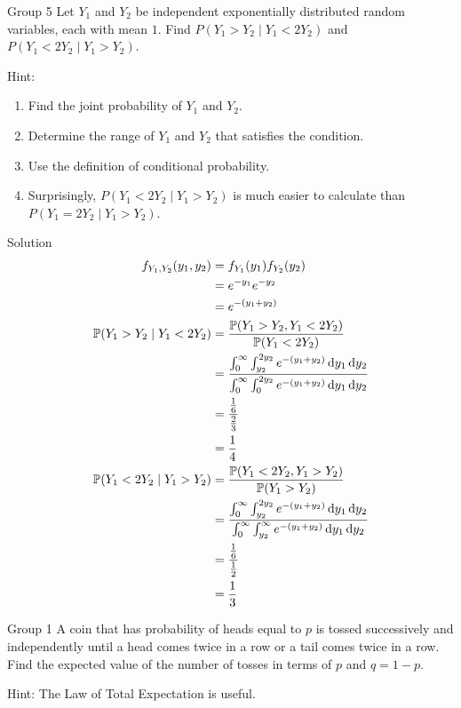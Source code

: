 \documentclass{article}
\begin{document}
\begin{problem}
    {Group 5}
    Let $Y_1$ and $Y_2$ be independent exponentially distributed random variables, each with mean $1$. Find $P( Y_1 > Y_2 \mid Y_1 < 2Y_2)$ and $P( Y_1 < 2Y_2 \mid Y_1 > Y_2)$.
    \begin{solution}
        {Hint:}
        \begin{enumerate}
            \item Find the joint probability of $Y_1$ and $Y_2$.
            \item Determine the range of $Y_1$ and $Y_2$ that satisfies the condition.
            \item Use the definition of conditional probability.
            \item Surprisingly, $P( Y_1 < 2Y_2 \mid Y_1 > Y_2)$ is much easier to calculate than $P( Y_1 = 2Y_2 \mid Y_1 > Y_2)$.
        \end{enumerate}
    \end{solution}
\end{problem}

\begin{solution}
    {Solution}
    \begin{align*}
        f_{Y_1,Y_2}(y_1,y_2)
        &= f_{Y_1}(y_1)f_{Y_2}(y_2) \\
        &= e^{-y_1}e^{-y_2} \\
        &= e^{-(y_1+y_2)} \\
        \P{Y_1>Y_2\mid Y_1<2Y_2}
        &= \frac{\P{Y_1>Y_2,Y_1<2Y_2}}{\P{Y_1<2Y_2}} \\
        &= \frac{\int_{0}^{\infty}\int_{y_2}^{2y_2}e^{-(y_1+y_2)}\diff y_1\diff y_2}{\int_{0}^{\infty}\int_{0}^{2y_2}e^{-(y_1+y_2)}\diff y_1\diff y_2} \\
        &= \frac{\frac{1}{6}}{\frac{2}{3}} \\
        &= \frac{1}{4} \\
        \P{Y_1<2Y_2\mid Y_1>Y_2}
        &= \frac{\P{Y_1<2Y_2,Y_1>Y_2}}{\P{Y_1>Y_2}} \\
        &= \frac{\int_{0}^{\infty}\int_{y_2}^{2y_2}e^{-(y_1+y_2)}\diff y_1\diff y_2}{\int_{0}^{\infty}\int_{y_2}^{\infty}e^{-(y_1+y_2)}\diff y_1\diff y_2} \\
        &= \frac{\frac{1}{6}}{\frac{1}{2}} \\
        &= \frac{1}{3}
    \end{align*}
\end{solution}
\fi
\iffalse
\begin{problem}
    {Group 1}
    A coin that has probability of heads equal to $p$ is tossed successively and independently until a head comes twice in a row or a tail comes twice in a row. Find the expected value of the number of tosses in terms of $p$ and $q=1-p$.
    \begin{solution}
        {Hint:}
        The Law of Total Expectation is useful.
    \end{solution}
\end{problem}
\end{document}
